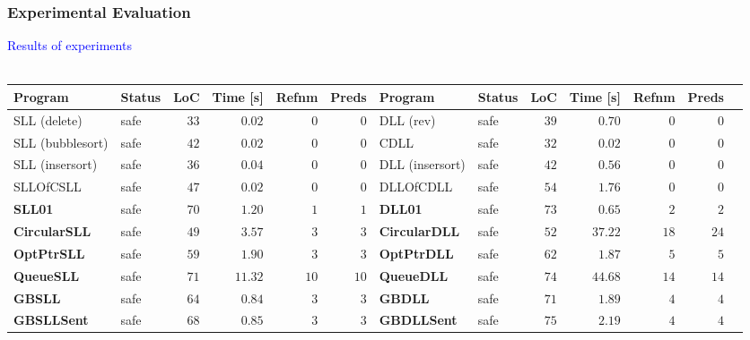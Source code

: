 \documentclass{beamer}
\newcommand{\hlbl}[1]{\textcolor{blue}{#1}}
\newcommand{\safe}[0]{safe}
\begin{document}
\begin{frame}
\frametitle{Experimental Evaluation}

	\begin{center}
	\hlbl{Results of experiments}
	\\~\\
	\begin{adjustbox}{max height=\textheight, max width=\textwidth}
	\begin{tabular}{| l | l | r | r | r | r || l | l | r | r | r | r | r |}
        \hline
		Program & Status & LoC & Time [s] & Refnm& Preds & Program & Status & LoC & Time [s] & Refnm & Preds \\
        \hline
        \hline
		SLL (delete) & \safe & $33$ & $0.02$ &  $0$ & $0$ & DLL (rev) & \safe & $39$ &  $0.70$ & $0$  & $0$ \\
        \hline
		SLL (bubblesort) & \safe & $42$ & $0.02$ &  $0$ & $0$ & CDLL & \safe & $32$ &  $0.02$  & $0$  & $0$ \\
        \hline
		SLL (insersort) & \safe & $36$ & $0.04$ & $0$ & $0$ & DLL (insersort) & \safe & $42$ &  $0.56$  & $0$  & $0$ \\
        \hline
		SLLOfCSLL & \safe & $47$ & $0.02$ & $0$ & $0$ & DLLOfCDLL & \safe & $54$ &  $1.76$  & $0$  & $0$ \\
        \hline
		\rowcolor{rowgray}
		\textbf{SLL01}    & \safe & $70$ & $1.20$   &  $1$ & $1$ & \textbf{DLL01} & \safe & $73$ &  $0.65$  & $2$  & $2$ \\
        \hline
		\rowcolor{rowgray}
		\textbf{CircularSLL} & \safe & $49$ & $3.57$   &  $3$  & $3$ & \textbf{CircularDLL} & \safe  & $52$ &  $37.22$ & $18$ & $24$ \\
        \hline
		\rowcolor{rowgray}
		\textbf{OptPtrSLL}   & \safe & $59$ & $1.90$ & $3$ & $3$ & \textbf{OptPtrDLL} & \safe & $62$ &  $1.87$  & $5$ & $5$ \\
        \hline
		\rowcolor{rowgray}
		\textbf{QueueSLL}    & \safe & $71$ & $11.32$  &  $10$ & $10$ & \textbf{QueueDLL} & \safe  & $74$ &  $44.68$ & $14$ & $14$ \\
		\rowcolor{rowgray}
        \hline
		\textbf{GBSLL}       & \safe & $64$ & $0.84$   &  $3$ & $3$ & \textbf{GBDLL} & \safe & $71$ &  $1.89$  & $4$ & $4$ \\
        \hline
		\rowcolor{rowgray}
		\textbf{GBSLLSent}   & \safe  & $68$ & $0.85$   &  $3$ & $3$ & \textbf{GBDLLSent} & \safe & $75$ &  $2.19$  & $4$ & $4$ \\

\end{tabular}
\end{adjustbox}
\end{center}
\end{frame}
\end{document}

